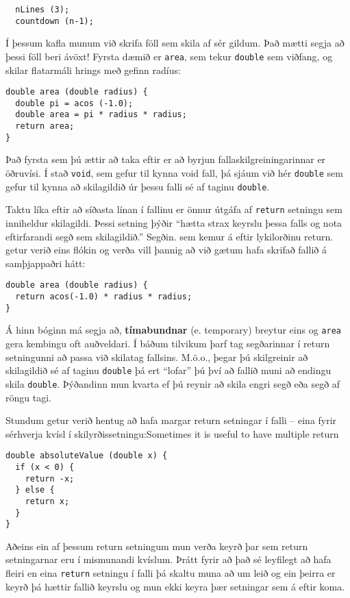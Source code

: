 \begin{verbatim}
  nLines (3);
  countdown (n-1);
\end{verbatim}
%
Í þessum kafla munum við skrifa föll sem skila af sér gildum.
Það mætti segja að þessi föll beri ávöxt!
Fyrsta dæmið er {\tt area}, sem tekur {\tt double} sem viðfang, og skilar flatarmáli hrings með gefinn radíus:


\begin{verbatim}
double area (double radius) {
  double pi = acos (-1.0);
  double area = pi * radius * radius;
  return area;
}
\end{verbatim}
%
Það fyrsta sem þú ættir að taka eftir er að byrjun fallaskilgreiningarinnar er öðruvísi.
Í stað {\tt void}, sem gefur til kynna void fall, þá sjáum við hér {\tt double} sem gefur til kynna að skilagildið úr þessu falli sé af taginu {\tt double}.

Taktu líka eftir að síðasta línan í fallinu er önnur útgáfa af {\tt return} setningu sem inniheldur skilagildi.
Þessi setning þýðir ``hætta strax keyrslu þessa falls og nota eftirfarandi segð sem skilagildið.''
Segðin. sem kemur á eftir lykilorðinu return. getur verið eins flókin og verða vill þannig að við gætum hafa skrifað fallið á samþjappaðri hátt:

\begin{verbatim}
double area (double radius) {
  return acos(-1.0) * radius * radius;
}
\end{verbatim}
%
Á hinn bóginn má segja að, {\bf tímabundnar} (e. temporary) breytur eins og {\tt area} gera kembingu oft auðveldari.
Í báðum tilvikum þarf tag segðarinnar í return setningunni að passa við skilatag fallsins.
M.ö.o., þegar þú skilgreinir að skilagildið sé af taginu {\tt double} þá ert ``lofar'' þú því að fallið muni að endingu skila {\tt double}.
Þýðandinn mun kvarta ef þú reynir að skila engri segð eða segð af röngu tagi. 


Stundum getur verið hentug að hafa margar return setningar í falli -- eina fyrir sérhverja kvísl í skilyrðissetningu:Sometimes it is useful to have multiple return

\begin{verbatim}
double absoluteValue (double x) {
  if (x < 0) {
    return -x;
  } else {
    return x;
  }
}
\end{verbatim}
%
Aðeins ein af þessum return setningum mun verða keyrð þar sem return setningarnar eru í mismunandi kvíslum.
Þrátt fyrir að það sé leyfilegt að hafa fleiri en eina {\tt return} setningu í falli þá skaltu muna að um leið og ein þeirra er keyrð þá hættir fallið keyrslu og mun ekki keyra þær setningar sem á eftir koma.

